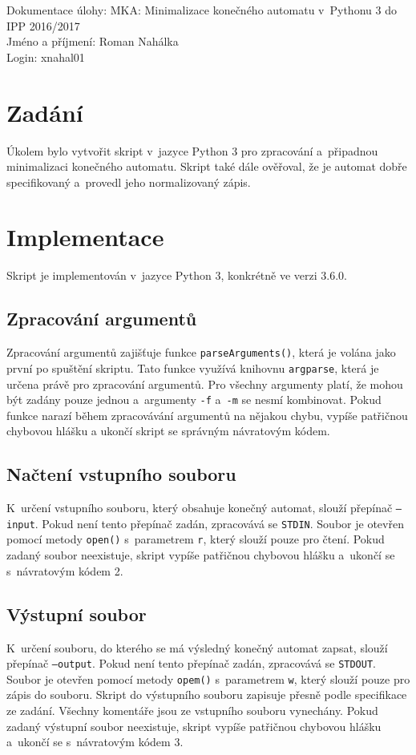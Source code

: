 \documentclass[a4paper, 10pt]{article}
\begin{document}
\noindent
Dokumentace úlohy: MKA: Minimalizace konečného automatu v~Pythonu 3 do IPP 2016/2017\\
Jméno a příjmení: Roman Nahálka\\
Login: xnahal01

\section{Zadání}
Úkolem bylo vytvořit skript v~jazyce Python 3 pro zpracování a~připadnou minimalizaci konečného automatu. Skript také dále ověřoval, že je automat dobře specifikovaný a~provedl jeho normalizovaný zápis.

\section{Implementace}
Skript je implementován v~jazyce Python 3, konkrétně ve verzi 3.6.0.

\subsection{Zpracování argumentů}
Zpracování argumentů zajišťuje funkce \texttt{parseArguments()}, která je volána jako první po spuštění skriptu. Tato funkce využívá knihovnu \texttt{argparse}, která je určena právě pro zpracování argumentů. Pro všechny argumenty platí, že mohou být zadány pouze jednou a~argumenty \texttt{-f} a~\texttt{-m} se nesmí kombinovat. Pokud funkce narazí během zpracovávání argumentů na nějakou chybu, vypíše patřičnou chybovou hlášku a ukončí skript se správným návratovým kódem. 

\subsection{Načtení vstupního souboru}
K~určení vstupního souboru, který obsahuje konečný automat, slouží přepínač \texttt{--input}. Pokud není tento přepínač zadán, zpracovává se \texttt{STDIN}. Soubor je otevřen pomocí metody \texttt{open()} s~parametrem \texttt{r}, který slouží pouze pro čtení. Pokud zadaný soubor neexistuje, skript vypíše patřičnou chybovou hlášku a~ukončí se s~návratovým kódem 2.  

\subsection{Výstupní soubor}
K~určení souboru, do kterého se má výsledný konečný automat zapsat, slouží přepínač \texttt{--output}. Pokud není tento přepínač zadán, zpracovává se \texttt{STDOUT}. Soubor je otevřen pomocí metody \texttt{opem()} s~parametrem \texttt{w}, který slouží pouze pro zápis do souboru. Skript do výstupního souboru zapisuje přesně podle specifikace ze zadání. Všechny komentáře jsou ze vstupního souboru vynechány. Pokud zadaný výstupní soubor neexistuje, skript vypíše patřičnou chybovou hlášku a~ukončí se s~návratovým kódem 3.
\end{document}
